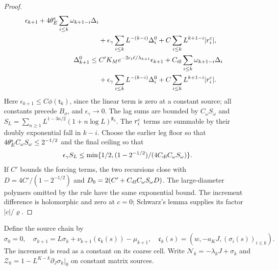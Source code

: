 \documentclass[11pt,letterpaper,reqno]{amsart}
\theoremstyle{definition}
\theoremstyle{remark}
\begin{document}
\begin{proof}
\[\begin{split}
 \epsilon_{k+1}+4\theta_E^{\rm s}\sum_{i\le k}\omega_{k+1-i}\Delta_i\\
 &+\epsilon_\gamma\sum_{i\le k}L^{-(k-i)}\Delta_i^0
                  +C\sum_{i\le k}L^{k+1-i}|r_i^{\rm c}|,\\
 \Delta_{k+1}^0\le{}&C'K_Me^{-2c_t\ell/\lambda_{k+1}}
 \epsilon_{k+1}+C_{\rm dl}\sum_{i\le k}\omega_{k+1-i}\Delta_i\\
 &+\epsilon_\gamma\sum_{i\le k}L^{-(k-i)}\Delta_i^0
                  +C\sum_{i\le k}L^{k+1-i}|r_i^{\rm c}|.
\end{split}
\]
Here $\epsilon_{k+1}\le C\phi(\mathsf t_k)$, since the
linear term is zero at a constant source; all constants
precede $B_\sigma$, and $\epsilon_\gamma\to0$.
The lag sums are bounded by $C_\omega S_\omega$ and
$S_L=\sum_{n\ge1}L^{1-3n/2}(1+n\log L)^{\mathfrak p_0}$.
The $r_i^{\rm c}$ terms are summable by their doubly exponential
fall in $k-i$. Choose the earlier leg floor so that
$4\theta_E^{\rm s}C_\omega S_\omega\le2^{-1/2}$ and the final
ceiling so that
\[
 \epsilon_\gamma S_L\le
 \min\{1/2,(1-2^{-1/2})/(4C_{\rm dl}C_\omega S_\omega)\}.
\]
If $C'$ bounds the forcing terms, the two recursions close
with $D=4C'/(1-2^{-1/2})$ and
$D_0=2(C'+C_{\rm dl}C_\omega S_\omega D)$.
The large-diameter polymers omitted by the rule have the
same exponential bound. The increment difference is
holomorphic and zero at $c=0$; Schwarz's lemma supplies
its factor $|c|/\varrho$.
\end{proof}

Define the source chain by
\[
 \sigma_0=0,\quad
 \sigma_{k+1}=L\sigma_k+\nu_{k+1}(\mathfrak c_k(s))-\mu_{k+1},
 \quad \mathfrak c_k(s)=(w,-a_KJ,(\sigma_i(s))_{i\le k}).
\]
The increment is read as a constant on its coarse cell.
Write $\mathcal N_k=-\lambda_kJ+\sigma_k$ and
$\mathcal Z_k=1-L^{K-k}\partial_J\sigma_k|_0$ on constant
matrix sources.
\end{document}
